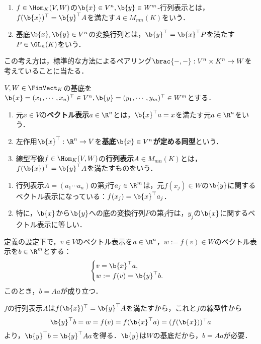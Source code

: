 \documentclass[uplatex, dvipdfmx]{jsreport}
\begin{document}
\begin{tcolorbox}[colframe=ForestGreen, colback=ForestGreen!10!white,breakable,colbacktitle=ForestGreen!40!white,coltitle=black,fonttitle=\bfseries\sffamily,
title=]
    \begin{enumerate}
        \item $f\in\Hom_K(V,W)$の$\b{x}\in V^n,\b{y}\in W^m$-行列表示とは，$f(\b{x})^\top=\b{y}^\top A$を満たす$A\in M_{mn}(K)$をいう．
        \item 基底$\b{x},\b{y}\in V^n$の変換行列とは，$\b{y}^\top=\b{x}^\top P$を満たす$P\in\GL_n(K)$をいう．
    \end{enumerate}
    この考え方は，標準的な方法によるペアリング$\brac{-,-}:V^n\times K^n\to W$を考えていることに当たる．
\end{tcolorbox}

\begin{definition}
    $V,W\in\FinVect_K$の基底を$\b{x}=(x_1,\cdots,x_n)^\top\in V^n,\b{y}=(y_1,\cdots,y_m)^\top\in W^m$とする．
    \begin{enumerate}
        \item 元$x\in V$の\textbf{ベクトル表示}$a\in\R^n$とは，$\b{x}^\top a=x$を満たす元$a\in\R^n$をいう．
        \item 左作用$\b{x}^\top:\R^n\to V$を\textbf{基底$\b{x}\in V^n$が定める同型}という．
        \item 線型写像$f\in\Hom_K(V,W)$の\textbf{行列表示}$A\in M_{mn}(K)$とは，$f(\b{x})^\top=\b{y}^\top A$を満たすものをいう．
    \end{enumerate}
\end{definition}
\begin{remarks}[始基底の行き先の終基底による表示を列ベクトルとした行列]\mbox{}
    \begin{enumerate}
        \item 行列表示$A=(a_1\cdots a_n)$の第$j$行$a_j\in\R^m$は，元$f(x_j)\in W$の$\b{y}$に関するベクトル表示になっている：$f(x_j)=\b{x}^\top a_j$．
        \item 特に，$\b{x}$から$\b{y}$への底の変換行列$P$の第$j$行は，$y_j$の$\b{x}$に関するベクトル表示に等しい．
    \end{enumerate}
\end{remarks}

\begin{proposition}[線型写像と行列表示の対応]
    定義の設定下で，$v\in V$のベクトル表示を$a\in\R^n$，$w:=f(v)\in W$のベクトル表示を$b\in\R^m$とする：
    \[\begin{cases}
        v=\b{x}^\top a,\\
        w:=f(v)=\b{y}^\top b.
    \end{cases}\]
    このとき，$b=Aa$が成り立つ．
\end{proposition}
\begin{Proof}
    $f$の行列表示$A$は$f(\b{x})^\top =\b{y}^\top A$を満たすから，これと$f$の線型性から
    \[\b{y}^\top b=w=f(v)=f(\b{x}^\top a)=(f(\b{x}))^\top a\]
    より，$\b{y}^\top b=\b{y}^\top Aa$を得る．$\b{y}$は$W$の基底だから，$b=Aa$が必要．
\end{Proof}
\end{document}
